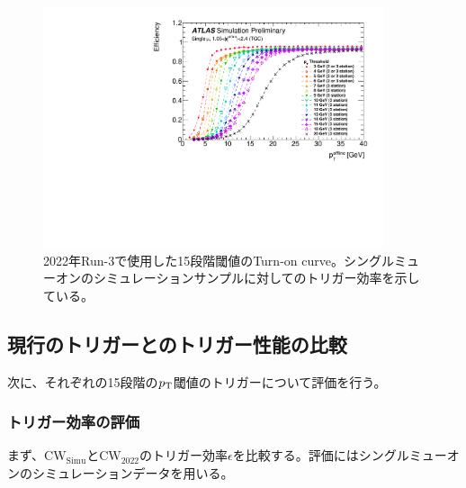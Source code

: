 \begin{figure}[tb]
  \centering
  \includegraphics[clip, width=10cm]{fig/3/PLOT-TRIG-2020-01-fig1.pdf}
  \caption{2022年Run-3で使用した15段階閾値のTurn-on curve。シングルミューオンのシミュレーションサンプルに対してのトリガー効率を示している。}
  \label{fig:Run3_15_MC5}
\end{figure}

\subsection{現行のトリガーとのトリガー性能の比較}
次に、それぞれの15段階の$p_{\rm{T}}$閾値のトリガーについて評価を行う。

\subsubsection{トリガー効率の評価}
まず、$\mathrm{CW_{Simu}}$と$\mathrm{CW_{2022}}$のトリガー効率$\epsilon$を比較する。評価にはシングルミューオンのシミュレーションデータを用いる。

